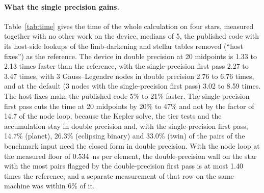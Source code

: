 \documentclass[11pt]{article}
\begin{document}
\paragraph{What the single precision gains.} Table~\ref{tab:time} gives the time of the whole calculation on four stars, measured together with no other work on the device, medians of 5, the published code with its host-side lookups of the limb-darkening and stellar tables removed (``host fixes'') as the reference. The device in double precision at 20 midpoints is 1.33 to 2.13 times faster than the reference, with the single-precision first pass 2.27 to 3.47 times, with 3 Gauss--Legendre nodes in double precision 2.76 to 6.76 times, and at the default (3 nodes with the single-precision first pass) 3.02 to 8.59 times. The host fixes make the published code 5\% to 21\% faster. The single-precision first pass cuts the time at 20 midpoints by 20\% to 47\% and not by the factor of 14.7 of the node loop, because the Kepler solve, the tier tests and the accumulation stay in double precision and, with the single-precision first pass, 14.7\% (planet), 26.3\% (eclipsing binary) and 33.0\% (twin) of the pairs of the benchmark input need the closed form in double precision. With the node loop at the measured floor of 0.534~ns per element, the double-precision wall on the star with the most pairs flagged by the double-precision first pass is at most 1.40 times the reference, and a separate measurement of that row on the same machine was within 6\% of it.
\end{document}
